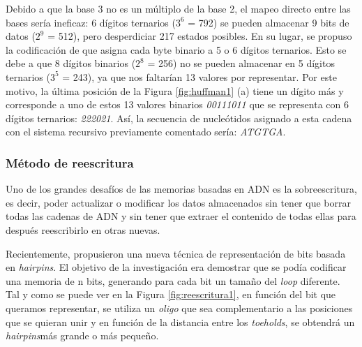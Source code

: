 \documentclass[a4paper,11pt]{article}
\begin{document}
Debido a que la base 3 no es un múltiplo de la base 2, el mapeo directo entre las bases sería ineficaz: 6 dígitos ternarios ($3^{6}$ = 792) se pueden almacenar 9 bits de datos ($2^{9}$ = 512), pero desperdiciar 217 estados posibles. En su lugar, se propuso la codificación de \cite{HUFFMANt1952} que asigna cada byte binario a 5 o 6 dígitos ternarios. Esto se debe a que 8 dígitos binarios ($2^{8}$ = 256) no se pueden almacenar en 5 dígitos ternarios ($3^{5}$ = 243), ya que nos faltarían 13 valores por representar. Por este motivo, la última posición de la Figura \ref{fig:huffman1} (a) tiene un dígito más y corresponde a uno de estos 13 valores binarios \textit{00111011} que se representa con 6 dígitos ternarios: \textit{222021}. Así, la secuencia de nucleótidos asignado a esta cadena con el sistema recursivo previamente comentado sería: \textit{ATGTGA}.

\subsubsection{Método de reescritura}

Uno de los grandes desafíos de las memorias basadas en ADN es la sobreescritura, es decir, poder actualizar o modificar los datos almacenados sin tener que borrar todas las cadenas de ADN y sin tener que extraer el contenido de todas ellas para después reescribirlo en otras nuevas.

Recientemente, \citep{Chandrasekaran2017} propusieron una nueva técnica de representación de bits basada en \textit{hairpins}. El objetivo de la investigación era demostrar que se podía codificar una memoria de n bits, generando para cada bit un tamaño del \textit{loop} diferente. Tal y como se puede ver en la Figura \ref{fig:reescritura1}, en función del bit que queramos representar, se utiliza un \textit{oligo} que sea complementario a las posiciones que se quieran unir y en función de la distancia entre los \textit{toeholds}, se obtendrá un \textit{hairpins}más grande o más pequeño.
\end{document}
